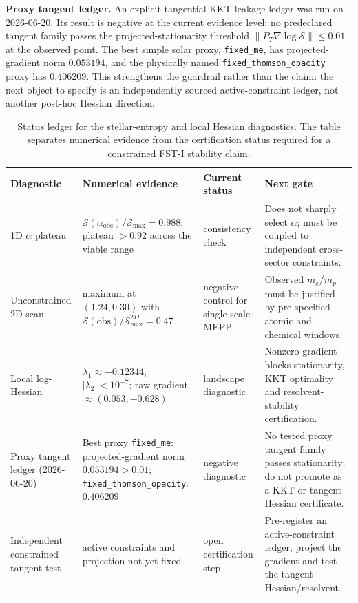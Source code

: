 \documentclass[12pt,a4paper]{article}
\theoremstyle{remark}
\begin{document}
\textbf{Proxy tangent ledger.} An explicit tangential-KKT leakage ledger was run on 2026-06-20. Its result is negative at the current evidence level: no predeclared tangent family passes the projected-stationarity threshold $\|P_T\nabla \log\mathcal{S}\|\leq 0.01$ at the observed point. The best simple solar proxy, \texttt{fixed\_me}, has projected-gradient norm $0.053194$, and the physically named \texttt{fixed\_thomson\_opacity} proxy has $0.406209$. This strengthens the guardrail rather than the claim: the next object to specify is an independently sourced active-constraint ledger, not another post-hoc Hessian direction.

\begin{table}[htbp]
\centering
\caption{Status ledger for the stellar-entropy and local Hessian diagnostics. The table separates numerical evidence from the certification status required for a constrained FST-I stability claim.}
\label{tab:kkt-ledger}
\begingroup\footnotesize
\begin{tabularx}{\textwidth}{p{}p{}p{}Y}
\toprule
\textbf{Diagnostic} & \textbf{Numerical evidence} & \textbf{Current status} & \textbf{Next gate} \\
\midrule
1D $\alpha$ plateau & $\mathcal{S}(\alpha_{\mathrm{obs}})/\mathcal{S}_{\max}=0.988$; plateau $>0.92$ across the viable range & consistency check & Does not sharply select $\alpha$; must be coupled to independent cross-sector constraints. \\
Unconstrained 2D scan & maximum at $(1.24,0.30)$ with $\mathcal{S}(\mathrm{obs})/\mathcal{S}_{\max}^{2D}=0.47$ & negative control for single-scale MEPP & Observed $m_e/m_p$ must be justified by pre-specified atomic and chemical windows. \\
Local log-Hessian & $\lambda_1\approx -0.12344$, $|\lambda_2|<10^{-7}$; raw gradient $\approx(0.053,-0.628)$ & landscape diagnostic & Nonzero gradient blocks stationarity, KKT optimality and resolvent-stability certification. \\
Proxy tangent ledger (2026-06-20) & Best proxy \texttt{fixed\_me}: projected-gradient norm $0.053194>0.01$; \texttt{fixed\_thomson\_opacity}: $0.406209$ & negative diagnostic & No tested proxy tangent family passes stationarity; do not promote as a KKT or tangent-Hessian certificate. \\
Independent constrained tangent test & active constraints and projection not yet fixed & open certification step & Pre-register an active-constraint ledger, project the gradient and test the tangent Hessian/resolvent. \\

\end{tabularx}
\end{table}
\end{document}
